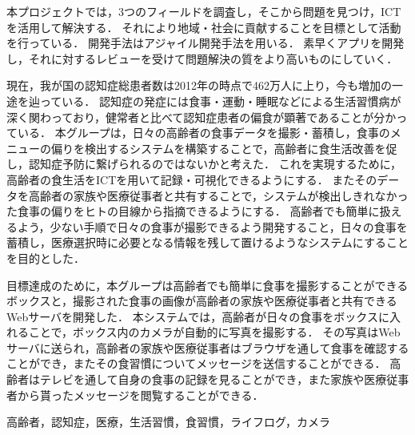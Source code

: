 \documentclass[../report]{subfiles}
\begin{document}
\begin{jabstract}
本プロジェクトでは，3つのフィールドを調査し，そこから問題を見つけ，ICTを活用して解決する．
それにより地域・社会に貢献することを目標として活動を行っている．
開発手法はアジャイル開発手法を用いる．
素早くアプリを開発し，それに対するレビューを受けて問題解決の質をより高いものにしていく．

現在，我が国の認知症総患者数は2012年の時点で462万人に上り，今も増加の一途を辿っている．
認知症の発症には食事・運動・睡眠などによる生活習慣病が深く関わっており，健常者と比べて認知症患者の偏食が顕著であることが分かっている．
本グループは，日々の高齢者の食事データを撮影・蓄積し，食事のメニューの偏りを検出するシステムを構築することで，高齢者に食生活改善を促し，認知症予防に繋げられるのではないかと考えた．
これを実現するために，高齢者の食生活をICTを用いて記録・可視化できるようにする．
またそのデータを高齢者の家族や医療従事者と共有することで，システムが検出しきれなかった食事の偏りをヒトの目線から指摘できるようにする．
高齢者でも簡単に扱えるよう，少ない手順で日々の食事が撮影できるよう開発すること，日々の食事を蓄積し，医療選択時に必要となる情報を残して置けるようなシステムにすることを目的とした．

目標達成のために，本グループは高齢者でも簡単に食事を撮影することができるボックスと，撮影された食事の画像が高齢者の家族や医療従事者と共有できるWebサーバを開発した．
本システムでは，高齢者が日々の食事をボックスに入れることで，ボックス内のカメラが自動的に写真を撮影する．
その写真はWebサーバに送られ，高齢者の家族や医療従事者はブラウザを通して食事を確認することができ，またその食習慣についてメッセージを送信することができる．
高齢者はテレビを通して自身の食事の記録を見ることができ，また家族や医療従事者から貰ったメッセージを閲覧することができる．

\begin{jkeyword}
高齢者，認知症，医療，生活習慣，食習慣，ライフログ，カメラ
\end{jkeyword}
\end{jabstract}
\end{document}
